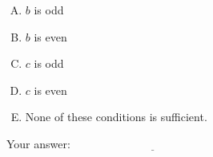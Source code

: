 \documentclass[10pt]{amsart}
\begin{document}
\begin{enumerate}
  \begin{enumerate}[(A)]
  \item $b$ is odd
  \item $b$ is even
  \item $c$ is odd
  \item $c$ is even
  \item None of these conditions is sufficient.
  \end{enumerate}

  \vspace{0.1in}
  Your answer: $\underline{\qquad\qquad\qquad\qquad\qquad\qquad\qquad}$
  \vspace{0.5in}
\end{enumerate}
\end{document}
